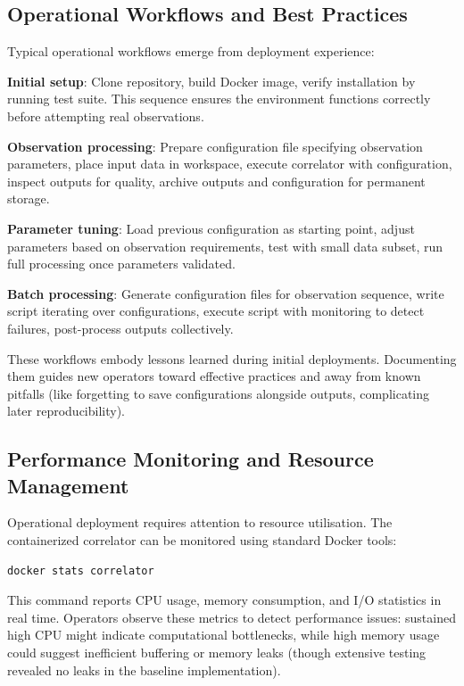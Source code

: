 \subsection{Operational Workflows and Best Practices}

Typical operational workflows emerge from deployment experience:

\textbf{Initial setup}: Clone repository, build Docker image, verify installation by running test suite. This sequence ensures the environment functions correctly before attempting real observations.

\textbf{Observation processing}: Prepare configuration file specifying observation parameters, place input data in workspace, execute correlator with configuration, inspect outputs for quality, archive outputs and configuration for permanent storage.

\textbf{Parameter tuning}: Load previous configuration as starting point, adjust parameters based on observation requirements, test with small data subset, run full processing once parameters validated.

\textbf{Batch processing}: Generate configuration files for observation sequence, write script iterating over configurations, execute script with monitoring to detect failures, post-process outputs collectively.

These workflows embody lessons learned during initial deployments. Documenting them guides new operators toward effective practices and away from known pitfalls (like forgetting to save configurations alongside outputs, complicating later reproducibility).

\subsection{Performance Monitoring and Resource Management}

Operational deployment requires attention to resource utilisation. The containerized correlator can be monitored using standard Docker tools:

\begin{verbatim}
docker stats correlator
\end{verbatim}

This command reports CPU usage, memory consumption, and I/O statistics in real time. Operators observe these metrics to detect performance issues: sustained high CPU might indicate computational bottlenecks, while high memory usage could suggest inefficient buffering or memory leaks (though extensive testing revealed no leaks in the baseline implementation).

